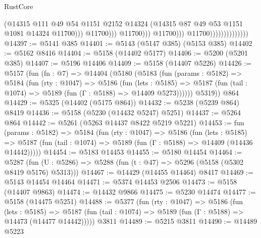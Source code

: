 \begin{lexlean}{RustCore}
\begin{coremodule}
                                                    (@14315
                                                      @111
                                                      @49
                                                      @54
                                                      @1151
                                                      @2152
                                                      @14324
                                                      (@14315
                                                        @87
                                                        @49
                                                        @53
                                                        @1151
                                                        @1081
                                                        @14324
                                                        @11700)))
                                                  @11700)))
                                            @11700)))
                                      @11700)))
                                @11700))))))))))))))
@14397 := @5141 @385
@14401 := @5143 (@5147 @385) (@5153 @385)
@14402 := @5162 @8416
@14404 := @5158 (@14402 @5177)
@14406 := @5200 (@5201 @385)
@14407 := @5196 @14406
@14409 := @5158 (@14407 @5226)
@14426 := @5157
    (fun (fn : @7) =>
    @14404
      (@5180
        (@5183
          (fun (params : @5182) =>
          @5184
            (fun (rty : @1047) =>
            @5186
              (fun (lets : @5185) =>
              @5187 (fun (tail : @1074) => @5189 (fun (Γ : @5188) => @14409 @5273))))))
        @5319))
    @864
@14429 := @5325 (@14402 (@5175 @864))
@14432 := @5238 (@5239 @864) @8419
@14436 := @5158 (@5230 (@14432 @5247) @5251)
@14437 := @5264 @864
@14442 := @5261 (@5263 @14437 @8422 @5219 @5221)
@14453 := fun (params : @5182) =>
  @5184
    (fun (rty : @1047) =>
    @5186
      (fun (lets : @5185) =>
      @5187 (fun (tail : @1074) => @5189 (fun (Γ : @5188) => @14409 (@14436 @14442)))))
@14454 := @5183 @14453
@14455 := @5180 @14454
@14464 := @5287
    (fun (U : @5286) => @5288 (fun (t : @47) => @5296 (@5158 (@5302 @8419 @5176) @5313)))
@14467 := @14429 (@14455 @14464) @8417
@14469 := @5143 @14454 @14464
@14471 := @5374 @14453 @2506
@14473 := @5158 (@14407 @9863)
@14474 := @14432 @9866
@14475 := @5230 @14474
@14477 := @5158 (@14475 @5251)
@14488 := @5377
    (fun (rty : @1047) =>
    @5186
      (fun (lets : @5185) =>
      @5187 (fun (tail : @1074) => @5189 (fun (Γ : @5188) => @14473 (@14477 @14442)))))
    @3811
@14489 := @5215 @3811
@14490 := @14489 @5223

\end{coremodule}
\end{lexlean}
